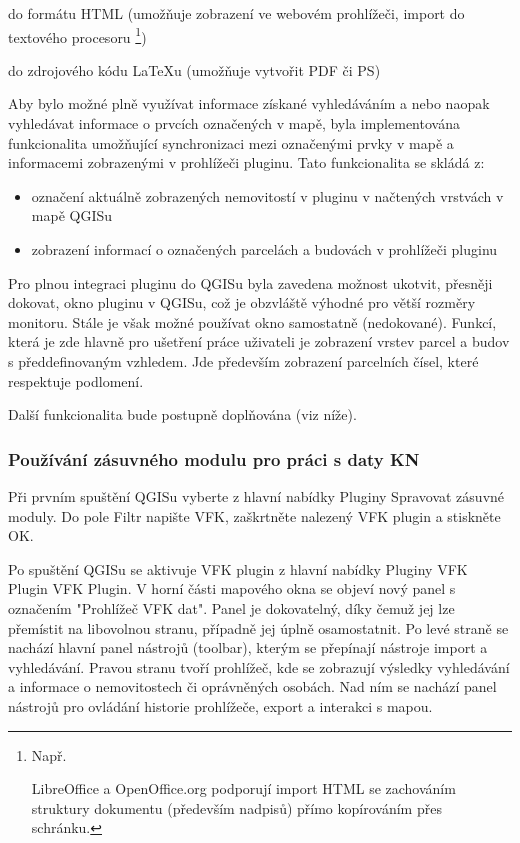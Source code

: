 \documentclass[a4paper,10pt]{article}
\begin{document}
\begin{itemize}
\item do formátu HTML (umožňuje zobrazení ve webovém prohlížeči, import do textového procesoru \footnote{Např. \item LibreOffice a OpenOffice.org podporují import HTML se zachováním struktury dokumentu (především nadpisů) přímo kopírováním přes schránku.})
\item do zdrojového kódu LaTeXu (umožňuje vytvořit PDF či PS)
\end{itemize}

Aby bylo možné plně využívat informace získané vyhledáváním a nebo naopak vyhledávat informace o prvcích označených v mapě, byla implementována funkcionalita umožňující synchronizaci mezi označenými prvky v mapě a informacemi zobrazenými v prohlížeči pluginu. Tato funkcionalita se skládá z:
\begin{itemize}
\item označení aktuálně zobrazených nemovitostí v pluginu v načtených vrstvách v mapě QGISu
\item zobrazení informací o označených parcelách a budovách v prohlížeči pluginu
\end{itemize}

Pro plnou integraci pluginu do QGISu byla zavedena možnost ukotvit, přesněji dokovat, okno pluginu v QGISu, což je obzvláště výhodné pro větší rozměry monitoru.
Stále je však možné používat okno samostatně (nedokované).
Funkcí, která je zde hlavně pro ušetření práce uživateli je zobrazení vrstev parcel a budov s předdefinovaným vzhledem.
Jde především zobrazení parcelních čísel, které respektuje podlomení.

Další funkcionalita bude postupně doplňována (viz níže).


\subsubsection{Používání zásuvného modulu pro práci s daty KN}
Při prvním spuštění QGISu vyberte z hlavní nabídky Pluginy \textrightarrow{} Spravovat zásuvné moduly.
Do pole Filtr napište VFK, zaškrtněte nalezený VFK plugin a stiskněte OK.

Po spuštění QGISu se aktivuje VFK plugin z hlavní nabídky Pluginy \textrightarrow{} VFK Plugin \textrightarrow{} VFK Plugin.
V horní části mapového okna se objeví nový panel s označením "Prohlížeč VFK dat".
Panel je dokovatelný, díky čemuž jej lze přemístit na libovolnou stranu, případně jej úplně osamostatnit.
Po levé straně se nachází hlavní panel nástrojů (toolbar), kterým se přepínají nástroje import a vyhledávání.
Pravou stranu tvoří prohlížeč, kde se zobrazují výsledky vyhledávání a informace o nemovitostech či oprávněných osobách.
Nad ním se nachází panel nástrojů pro ovládání historie prohlížeče, export a interakci s mapou.
\end{document}
